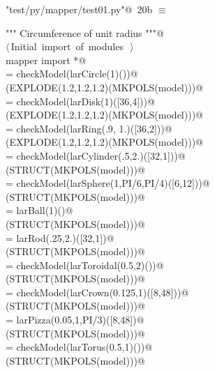 \documentclass[11pt,oneside]{article}	%
\begin{document}
\begin{flushleft} \small \label{scrap38}
\protect{}\verb@"test/py/mapper/test01.py"@\nobreak\ {\footnotesize 20b }$\equiv$
\vspace{-1ex}
\begin{list}{}{} \item
\mbox{}\verb@""" Circumference of unit radius """@\\
\mbox{}\verb@@\hbox{$\langle\,$Initial import of modules\nobreak\ {\footnotesize {}}$\,\rangle$}\verb@@\\
\mbox{}\verb@from mapper import *@\\
\mbox{}\verb@model = checkModel(larCircle(1)())@\\
\mbox{}\verb@VIEW(EXPLODE(1.2,1.2,1.2)(MKPOLS(model)))@\\
\mbox{}\verb@model = checkModel(larDisk(1)([36,4]))@\\
\mbox{}\verb@VIEW(EXPLODE(1.2,1.2,1.2)(MKPOLS(model)))@\\
\mbox{}\verb@model = checkModel(larRing(.9, 1.)([36,2]))@\\
\mbox{}\verb@VIEW(EXPLODE(1.2,1.2,1.2)(MKPOLS(model)))@\\
\mbox{}\verb@model = checkModel(larCylinder(.5,2.)([32,1]))@\\
\mbox{}\verb@VIEW(STRUCT(MKPOLS(model)))@\\
\mbox{}\verb@model = checkModel(larSphere(1,PI/6,PI/4)([6,12]))@\\
\mbox{}\verb@VIEW(STRUCT(MKPOLS(model)))@\\
\mbox{}\verb@model = larBall(1)()@\\
\mbox{}\verb@VIEW(STRUCT(MKPOLS(model)))@\\
\mbox{}\verb@model = larRod(.25,2.)([32,1])@\\
\mbox{}\verb@VIEW(STRUCT(MKPOLS(model)))@\\
\mbox{}\verb@model = checkModel(larToroidal(0.5,2)())@\\
\mbox{}\verb@VIEW(STRUCT(MKPOLS(model)))@\\
\mbox{}\verb@model = checkModel(larCrown(0.125,1)([8,48]))@\\
\mbox{}\verb@VIEW(STRUCT(MKPOLS(model)))@\\
\mbox{}\verb@model = larPizza(0.05,1,PI/3)([8,48])@\\
\mbox{}\verb@VIEW(STRUCT(MKPOLS(model)))@\\
\mbox{}\verb@model = checkModel(larTorus(0.5,1)())@\\
\mbox{}\verb@VIEW(STRUCT(MKPOLS(model)))@\\
\mbox{}\verb@@{\NWsep}
\end{list}
\vspace{-2ex}
\end{flushleft}
\end{document}
